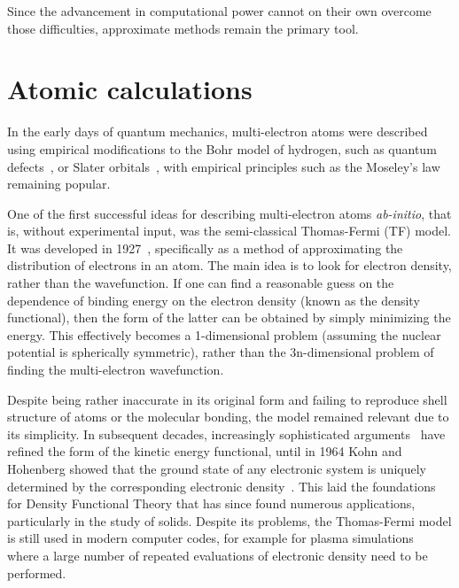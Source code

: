 Since the advancement in computational power cannot on their own overcome those difficulties, approximate methods remain the primary tool.

\section{Atomic calculations}

In the early days of quantum mechanics, multi-electron atoms were described using empirical modifications to the Bohr model of hydrogen, such as quantum defects~\cite{Seaton_1983}, or Slater orbitals~\cite{slater_atomic_1930}, with empirical principles such as the Moseley's law~\cite{14786441308635052} remaining popular. 

One of the first successful ideas for describing multi-electron atoms \textit{ab-initio}, that is, without experimental input, was the semi-classical Thomas-Fermi (TF) model. It was developed in 1927~\cite{1927PCPS2542T}, specifically as a method of approximating the distribution of electrons in an atom. The main idea is to look for electron density, rather than the wavefunction. If one can find a reasonable guess on the dependence of binding energy on the electron density (known as the density functional), then the form of the latter can be obtained by simply minimizing the energy. This effectively becomes a 1-dimensional problem (assuming the nuclear potential is spherically symmetric), rather than the 3n-dimensional problem of finding the multi-electron wavefunction.

Despite being rather inaccurate in its original form and failing to reproduce shell structure of atoms or the molecular bonding, the model remained relevant due to its simplicity. In subsequent decades, increasingly sophisticated arguments~\cite{1927PCPS2542T} have refined the form of the kinetic energy functional, until in 1964 Kohn and Hohenberg showed that the ground state of any electronic system is uniquely determined by the corresponding electronic density~\cite{PhysRev.136.B864}. This laid the foundations for Density Functional Theory that has since found numerous applications, particularly in the study of solids. Despite its problems, the Thomas-Fermi model is still used in modern computer codes, for example for plasma simulations~\cite{ciricosta_direct_2012, starrett_thomas-fermi_2017, dyachkov_region_2016} where a large number of repeated evaluations of electronic density need to be performed.
  
